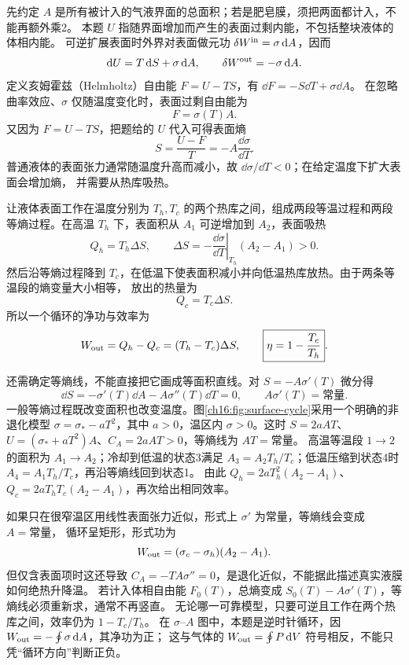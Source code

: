 {\par\nopagebreak[4]\begin{xesolution}
先约定 $A$ 是所有被计入的气液界面的总面积；若是肥皂膜，须把两面都计入，不能再额外乘2。
本题 $U$ 指随界面增加而产生的表面过剩内能，不包括整块液体的体相内能。
可逆扩展表面时外界对表面做元功 $\delta W^{\rm in}=\sigma\mathop{}\!\mathrm d A$，因而
\[
 \mathop{}\!\mathrm d U=T\mathop{}\!\mathrm d S+\sigma\mathop{}\!\mathrm d A,\qquad
 \delta W^{\rm out}=-\sigma\mathop{}\!\mathrm d A.
\]
定义亥姆霍兹（Helmholtz）自由能 $F=U-TS$，有 $\dd F=-S\dd T+\sigma\dd A$。
在忽略曲率效应、$\sigma$ 仅随温度变化时，表面过剩自由能为
\[
  F=\sigma(T)A.
\]
又因为 $F=U-TS$，把题给的 $U$ 代入可得表面熵
\[
  S=\frac{U-F}{T}
  =-A\frac{\dd\sigma}{\dd T}.
\]
普通液体的表面张力通常随温度升高而减小，故 $\dd\sigma/\dd T<0$；在给定温度下扩大表面会增加熵，
并需要从热库吸热。

让液体表面工作在温度分别为 $T_h,T_c$ 的两个热库之间，组成两段等温过程和两段等熵过程。在高温
$T_h$ 下，表面积从 $A_1$ 可逆增加到 $A_2$，表面吸热
\[
  Q_h=T_h\Delta S,
  \qquad
  \Delta S=-\left.\frac{\dd\sigma}{\dd T}\right|_{T_h}(A_2-A_1)>0.
\]
然后沿等熵过程降到 $T_c$，在低温下使表面积减小并向低温热库放热。由于两条等温段的熵变量大小相等，
放出的热量为
\[
  Q_c=T_c\Delta S.
\]
所以一个循环的净功与效率为
\[
  W_{\rm out}=Q_h-Q_c=(T_h-T_c)\Delta S,
  \qquad
  \boxed{\eta=1-\frac{T_c}{T_h}}.
\]

\par\noindent\begin{minipage}{\linewidth}
\surfaceEngineDiagram
{}\label{ch16:fig:surface-cycle}
\end{minipage}\par\medskip

还需确定等熵线，不能直接把它画成等面积直线。对 $S=-A\sigma'(T)$ 微分得
\[
 \dd S=-\sigma'(T)\dd A-A\sigma''(T)\dd T=0,
 \qquad A\sigma'(T)=\text{常量}.
\]
一般等熵过程既改变面积也改变温度。图\ref{ch16:fig:surface-cycle}采用一个明确的非退化模型
$\sigma=\sigma_*-aT^2$，其中 $a>0$，温区内 $\sigma>0$。这时
$S=2aAT$、$U=(\sigma_*+aT^2)A$、$C_A=2aAT>0$，等熵线为 $AT=\text{常量}$。
高温等温段 $1\to2$ 的面积为 $A_1\to A_2$；冷却到低温的状态3满足
$A_3=A_2T_h/T_c$；低温压缩到状态4时 $A_4=A_1T_h/T_c$，再沿等熵线回到状态1。
由此 $Q_h=2aT_h^2(A_2-A_1)$、$Q_c=2aT_hT_c(A_2-A_1)$，再次给出相同效率。

如果只在很窄温区用线性表面张力近似，形式上 $\sigma'$ 为常量，等熵线会变成 $A=\text{常量}$，
循环呈矩形，形式功为
\[
  W_{\rm out}=(\sigma_c-\sigma_h)(A_2-A_1).
\]
但仅含表面项时这还导致 $C_A=-TA\sigma''=0$，是退化近似，不能据此描述真实液膜如何绝热升降温。
若计入体相自由能 $F_0(T)$，总熵变成 $S_0(T)-A\sigma'(T)$，等熵线必须重新求，通常不再竖直。
无论哪一可靠模型，只要可逆且工作在两个热库之间，效率仍为 $1-T_c/T_h$。
在 $\sigma$--$A$ 图中，本题是逆时针循环，因 $W_{\rm out}=-\oint\sigma\mathop{}\!\mathrm d A$，其净功为正；
这与气体的 $W_{\rm out}=\oint P\mathop{}\!\mathrm d V$ 符号相反，不能只凭“循环方向”判断正负。
\end{xesolution}
}

\endgroup

\hypersetup{bookmarksdepth=2}
